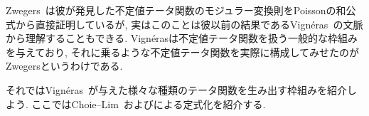 \documentclass[11pt,b5paper,oneside,lualatex]{ltjsarticle} %
\numberwithin{equation}{section} %
\begin{document}

Zwegers~\cite{Zwegers_thesis}は彼が発見した不定値テータ関数のモジュラー変換則をPoissonの和公式から直接証明しているが, 実はこのことは彼以前の結果であるVign\'{e}ras~\cite{Vigneras}の文脈から理解することもできる. 
Vign\'{e}rasは不定値テータ関数を扱う一般的な枠組みを与えており, それに乗るような不定値テータ関数を実際に構成してみせたのがZwegersというわけである. 





それではVign\'{e}ras~\cite{Vigneras}が与えた様々な種類のテータ関数を生み出す枠組みを紹介しよう. 
ここではChoie--Lim~\cite{Choie_Lim}および\cite{BFOR}による定式化を紹介する. 
\end{document}
